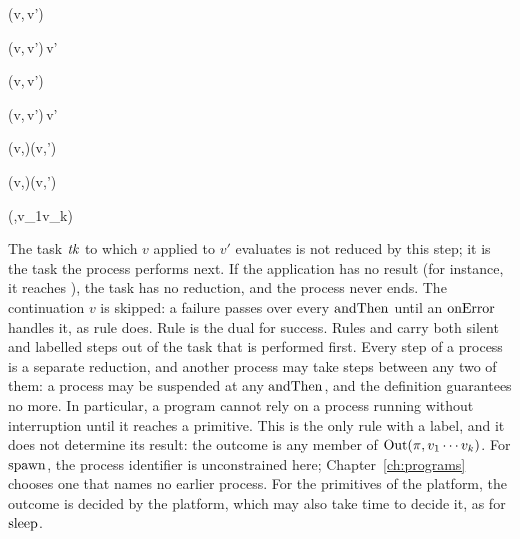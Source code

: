 
  {\effandThen(v,\effsucceed\,v')\effred{}\tk}

  {\effandThen(v,\efffail\,v')\effred{}\efffail\,v'}

  {\effonError(v,\efffail\,v')\effred{}\tk}

  {\effonError(v,\effsucceed\,v')\effred{}\effsucceed\,v'}

  {\effandThen(v,\tk)\effred{\opt{\effa}}\effandThen(v,\tk')}

  {\effonError(v,\tk)\effred{\opt{\effa}}\effonError(v,\tk')}

  {\effprim(\pi,v_1\cdots v_k)\tk}

\begin{rulecomments}
 The task $\mathit{tk}$ to which $v$ applied to
$v'$ evaluates is not reduced by this step; it is the task the process
performs next. If the application has no result (for instance, it reaches
), the task has no reduction, and the process never ends.
 The continuation $v$ is skipped: a failure
passes over every $\mathrm{andThen}$ until an $\mathrm{onError}$ handles it, as rule
 does. Rule 
is the dual for success.
 Rules  and
 carry both silent and labelled steps out of
the task that is performed first. Every step of a process is a separate
reduction, and another process may take steps between any two of them: a
process may be suspended at any $\mathrm{andThen}$, and the definition guarantees
no more. In particular, a program cannot rely on a process running without
interruption until it reaches a primitive. %
 This is the only rule with a label, and it does not
determine its result: the outcome is any member of
$\mathrm{Out}(\pi,v_1\cdots v_k)$. For $\mathrm{spawn}$, the process identifier is
unconstrained here; Chapter~\ref{ch:programs} chooses one that names no
earlier process. For the primitives of the platform, the outcome is decided
by the platform, which may also take time to decide it, as for
$\mathrm{sleep}$. %
\end{rulecomments}

